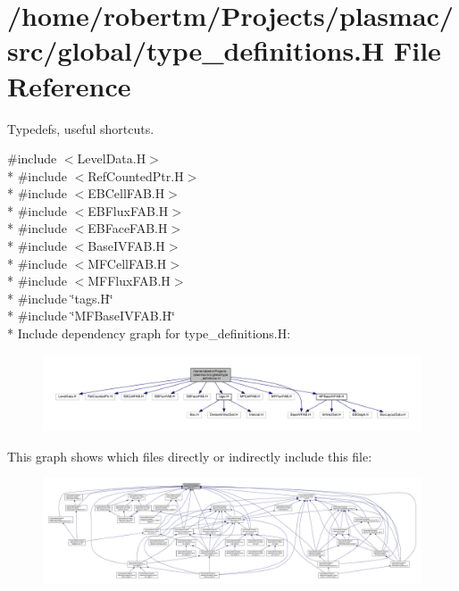 \hypertarget{type__definitions_8H}{}\section{/home/robertm/\+Projects/plasmac/src/global/type\+\_\+definitions.H File Reference}
\label{type__definitions_8H}


Typedefs, useful shortcuts.  


{\ttfamily \#include $<$Level\+Data.\+H$>$}\\*
{\ttfamily \#include $<$Ref\+Counted\+Ptr.\+H$>$}\\*
{\ttfamily \#include $<$E\+B\+Cell\+F\+A\+B.\+H$>$}\\*
{\ttfamily \#include $<$E\+B\+Flux\+F\+A\+B.\+H$>$}\\*
{\ttfamily \#include $<$E\+B\+Face\+F\+A\+B.\+H$>$}\\*
{\ttfamily \#include $<$Base\+I\+V\+F\+A\+B.\+H$>$}\\*
{\ttfamily \#include $<$M\+F\+Cell\+F\+A\+B.\+H$>$}\\*
{\ttfamily \#include $<$M\+F\+Flux\+F\+A\+B.\+H$>$}\\*
{\ttfamily \#include \char`\"{}tags.\+H\char`\"{}}\\*
{\ttfamily \#include \char`\"{}M\+F\+Base\+I\+V\+F\+A\+B.\+H\char`\"{}}\\*
Include dependency graph for type\+\_\+definitions.\+H\+:\nopagebreak
\begin{figure}[H]
\begin{center}
\leavevmode
\includegraphics[width=350pt]{type__definitions_8H__incl}
\end{center}
\end{figure}
This graph shows which files directly or indirectly include this file\+:\nopagebreak
\begin{figure}[H]
\begin{center}
\leavevmode
\includegraphics[width=350pt]{type__definitions_8H__dep__incl}
\end{center}
\end{figure}
